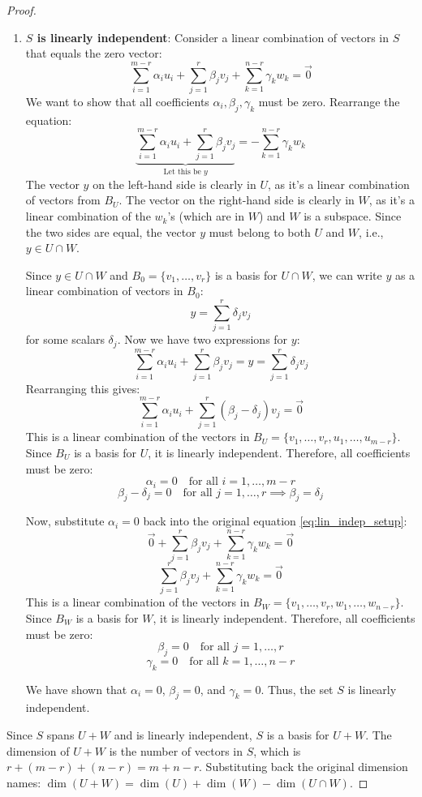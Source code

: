 \documentclass[11pt]{article}
\theoremstyle{definition}
\theoremstyle{remark}
\newcommand{\dimn}{\operatorname{dim}}
\newcommand{\intersect}{\cap}
\begin{document}
\begin{proof}
\begin{enumerate}
    \item \textbf{$S$ is linearly independent}: Consider a linear combination of vectors in $S$ that equals the zero vector:
    \begin{equation} \label{eq:lin_indep_setup}
    \sum_{i=1}^{m-r} \alpha_i u_i + \sum_{j=1}^{r} \beta_j v_j + \sum_{k=1}^{n-r} \gamma_k w_k = \vec{0}
    \end{equation}
    We want to show that all coefficients $\alpha_i, \beta_j, \gamma_k$ must be zero. Rearrange the equation:
    \[ \underbrace{\sum_{i=1}^{m-r} \alpha_i u_i + \sum_{j=1}^{r} \beta_j v_j}_{\text{Let this be } y} = - \sum_{k=1}^{n-r} \gamma_k w_k \]
    The vector $y$ on the left-hand side is clearly in $U$, as it's a linear combination of vectors from $B_U$.
    The vector on the right-hand side is clearly in $W$, as it's a linear combination of the $w_k$'s (which are in $W$) and $W$ is a subspace.
    Since the two sides are equal, the vector $y$ must belong to both $U$ and $W$, i.e., $y \in U \intersect W$.

    Since $y \in U \intersect W$ and $B_0 = \{v_1, \dots, v_r\}$ is a basis for $U \intersect W$, we can write $y$ as a linear combination of vectors in $B_0$:
    \[ y = \sum_{j=1}^r \delta_j v_j \]
    for some scalars $\delta_j$.
    Now we have two expressions for $y$:
    \[ \sum_{i=1}^{m-r} \alpha_i u_i + \sum_{j=1}^{r} \beta_j v_j = y = \sum_{j=1}^r \delta_j v_j \]
    Rearranging this gives:
    \[ \sum_{i=1}^{m-r} \alpha_i u_i + \sum_{j=1}^{r} (\beta_j - \delta_j) v_j = \vec{0} \]
    This is a linear combination of the vectors in $B_U = \{v_1, \dots, v_r, u_1, \dots, u_{m-r}\}$. Since $B_U$ is a basis for $U$, it is linearly independent. Therefore, all coefficients must be zero:
    \[ \alpha_i = 0 \quad \text{for all } i=1, \dots, m-r \]
    \[ \beta_j - \delta_j = 0 \quad \text{for all } j=1, \dots, r \implies \beta_j = \delta_j \]

    Now, substitute $\alpha_i = 0$ back into the original equation \eqref{eq:lin_indep_setup}:
    \[ \vec{0} + \sum_{j=1}^{r} \beta_j v_j + \sum_{k=1}^{n-r} \gamma_k w_k = \vec{0} \]
    \[ \sum_{j=1}^{r} \beta_j v_j + \sum_{k=1}^{n-r} \gamma_k w_k = \vec{0} \]
    This is a linear combination of the vectors in $B_W = \{v_1, \dots, v_r, w_1, \dots, w_{n-r}\}$. Since $B_W$ is a basis for $W$, it is linearly independent. Therefore, all coefficients must be zero:
    \[ \beta_j = 0 \quad \text{for all } j=1, \dots, r \]
    \[ \gamma_k = 0 \quad \text{for all } k=1, \dots, n-r \]

    We have shown that $\alpha_i=0$, $\beta_j=0$, and $\gamma_k=0$. Thus, the set $S$ is linearly independent.
\end{enumerate}
Since $S$ spans $U+W$ and is linearly independent, $S$ is a basis for $U+W$.
The dimension of $U+W$ is the number of vectors in $S$, which is $r + (m-r) + (n-r) = m+n-r$.
Substituting back the original dimension names: $\dimn(U+W) = \dimn(U) + \dimn(W) - \dimn(U \intersect W)$.
\end{proof}
\end{document}
